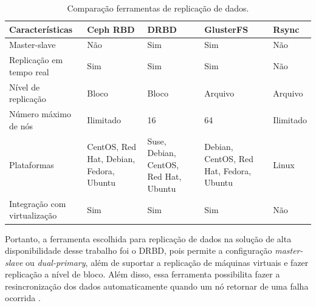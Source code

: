 \begin{table}[h!]
\caption{Comparação ferramentas de replicação de dados.}
\label{tab:replicacao}
\begin{center}
\begin{tabular}{|l|p{2.7cm}|p{2.7cm}|p{2.7cm}|p{2cm}|}\hline
\textbf{Características} & \textbf{Ceph RBD} & \textbf{DRBD} & \textbf{GlusterFS} & \textbf{Rsync} \\\hline
Master-slave & Não & Sim & Sim & Não \\\hline
Replicação em tempo real & Sim & Sim & Sim & Não \\\hline
Nível de replicação & Bloco & Bloco & Arquivo & Arquivo \\\hline
Número máximo de nós & Ilimitado & 16 & 64 & Ilimitado \\\hline
Plataformas & CentOS, Red Hat, Debian, Fedora, Ubuntu & Suse, Debian, CentOS, Red Hat, Ubuntu & Debian, CentOS, Red Hat, Fedora, Ubuntu & Linux \\\hline
Integração com virtualização & Sim & Sim & Sim & Não \\\hline
\end{tabular}
\end{center}
\end{table}

Portanto, a ferramenta escolhida para replicação de dados na solução de alta disponibilidade desse trabalho foi o \ac{DRBD}, pois permite a 
configuração \textit{master-slave} ou \textit{dual-primary}, além de suportar a replicação de máquinas virtuais e fazer replicação a nível de 
bloco. Além disso, essa ferramenta possibilita fazer a resincronização dos dados automaticamente quando um nó retornar de uma falha 
ocorrida \cite{drbd}.




